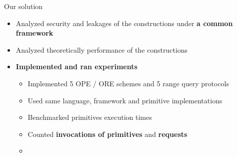 \begin{frame}[label={frame:ore}]
\begin{columns}[T,onlytextwidth]
{\begin{block}{Our solution}
						\begin{itemize}[leftmargin=*]
							\item Analyzed security and leakages of the constructions under \textbf{a common framework}
							\item Analyzed theoretically performance of the constructions
							\item \textbf{Implemented and ran experiments}
							\begin{itemize}[leftmargin=*]
								\item Implemented 5 OPE / ORE schemes and 5 range query protocols
								\item Used same language, framework and primitive implementations
								\item Benchmarked primitives execution times
								\item Counted \textbf{invocations of primitives} and \textbf{\IO{} requests}
								\item[]
									\hyperlink{frame:appendix:ore}{}
									\hyperlink{frame:appendix:protocols}{}
									\hyperlink{frame:appendix:plot}{}
							\end{itemize}
						\end{itemize}

					\end{block}
				}

		\end{columns}

	\end{frame}
